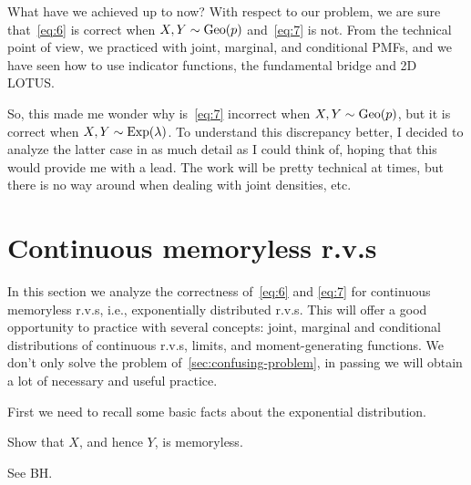 \documentclass[a4paper,11pt]{article}
\begin{document}
What have we achieved up to now? With respect to our problem, we are sure that~\eqref{eq:6} is correct when $X, Y \sim \mathrm{Geo}(p)$ and~\cref{eq:7} is not.
From the technical point of view, we practiced with joint, marginal, and conditional PMFs, and we have seen how to use indicator functions, the fundamental bridge and 2D LOTUS. 

So, this made me wonder why is~\eqref{eq:7} incorrect when $X, Y\sim\mathrm{Geo}(p)$, but it is correct when $X,Y\sim\mathrm{Exp}(\lambda)$.
To understand this discrepancy better, I decided to analyze the latter case in as much detail as I could think of, hoping that this would  provide me with a lead.
The work will be pretty technical at times, but there is no way around when dealing with joint densities, etc.



\section{Continuous memoryless r.v.s}
\label{sec:exerc-expon-distr}

In this section we analyze the correctness of~\cref{eq:6} and \cref{eq:7} for continuous memoryless r.v.s, i.e., exponentially distributed r.v.s.
This will offer a good opportunity to practice with several concepts: joint, marginal and conditional distributions of continuous r.v.s,  limits, and moment-generating functions.
We don't only solve the problem of~\cref{sec:confusing-problem}, in passing we will obtain a lot of necessary and useful practice.

First we need to recall some basic facts about the exponential distribution.

\begin{exercise}
Show that $X$, and hence $Y$, is memoryless.
\begin{solution}
  See BH.
\end{solution}
\end{exercise}
\end{document}
